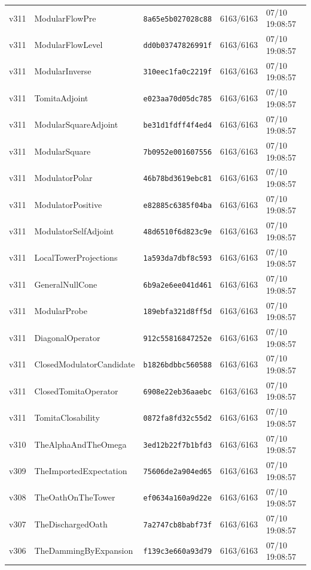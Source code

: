 \documentclass[11pt]{article}
\theoremstyle{definition}\newtheorem{deriv}{Derivação}
\begin{document}
{\begin{longtable}{@{}lllll@{}}
v311 & ModularFlowPre & \texttt{8a65e5b027028c88} & 6163/6163 & 07/10 19:08:57 \\
v311 & ModularFlowLevel & \texttt{dd0b03747826991f} & 6163/6163 & 07/10 19:08:57 \\
v311 & ModularInverse & \texttt{310eec1fa0c2219f} & 6163/6163 & 07/10 19:08:57 \\
v311 & TomitaAdjoint & \texttt{e023aa70d05dc785} & 6163/6163 & 07/10 19:08:57 \\
v311 & ModularSquareAdjoint & \texttt{be31d1fdff4f4ed4} & 6163/6163 & 07/10 19:08:57 \\
v311 & ModularSquare & \texttt{7b0952e001607556} & 6163/6163 & 07/10 19:08:57 \\
v311 & ModulatorPolar & \texttt{46b78bd3619ebc81} & 6163/6163 & 07/10 19:08:57 \\
v311 & ModulatorPositive & \texttt{e82885c6385f04ba} & 6163/6163 & 07/10 19:08:57 \\
v311 & ModulatorSelfAdjoint & \texttt{48d6510f6d823c9e} & 6163/6163 & 07/10 19:08:57 \\
v311 & LocalTowerProjections & \texttt{1a593da7dbf8c593} & 6163/6163 & 07/10 19:08:57 \\
v311 & GeneralNullCone & \texttt{6b9a2e6ee041d461} & 6163/6163 & 07/10 19:08:57 \\
v311 & ModularProbe & \texttt{189ebfa321d8ff5d} & 6163/6163 & 07/10 19:08:57 \\
v311 & DiagonalOperator & \texttt{912c55816847252e} & 6163/6163 & 07/10 19:08:57 \\
v311 & ClosedModulatorCandidate & \texttt{b1826bdbbc560588} & 6163/6163 & 07/10 19:08:57 \\
v311 & ClosedTomitaOperator & \texttt{6908e22eb36aaebc} & 6163/6163 & 07/10 19:08:57 \\
v311 & TomitaClosability & \texttt{0872fa8fd32c55d2} & 6163/6163 & 07/10 19:08:57 \\
v310 & TheAlphaAndTheOmega & \texttt{3ed12b22f7b1bfd3} & 6163/6163 & 07/10 19:08:57 \\
v309 & TheImportedExpectation & \texttt{75606de2a904ed65} & 6163/6163 & 07/10 19:08:57 \\
v308 & TheOathOnTheTower & \texttt{ef0634a160a9d22e} & 6163/6163 & 07/10 19:08:57 \\
v307 & TheDischargedOath & \texttt{7a2747cb8babf73f} & 6163/6163 & 07/10 19:08:57 \\
v306 & TheDammingByExpansion & \texttt{f139c3e660a93d79} & 6163/6163 & 07/10 19:08:57 \\

\end{longtable}}
\end{document}
